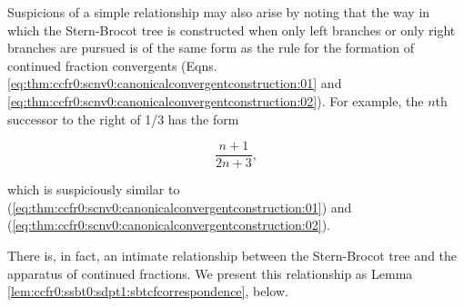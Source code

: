 Suspicions of a simple relationship may also arise by noting that the 
way in which the Stern-Brocot tree is constructed when only left branches
or only right branches are pursued is of the same form as the rule for
the formation of continued fraction convergents (Eqns. 
\ref{eq:thm:ccfr0:scnv0:canonicalconvergentconstruction:01}
and \ref{eq:thm:ccfr0:scnv0:canonicalconvergentconstruction:02}).  For example,
the $n$th successor to the right of 1/3 has the form

\begin{equation}
\label{eq:ccfr0:ssbt0:sdpt1:01}
\frac{n + 1}{2n+3},
\end{equation}

\noindent{}which is suspiciously similar to 
(\ref{eq:thm:ccfr0:scnv0:canonicalconvergentconstruction:01}) and 
(\ref{eq:thm:ccfr0:scnv0:canonicalconvergentconstruction:02}).

There is, in fact, an intimate relationship between the Stern-Brocot
tree and the apparatus of continued fractions.  We present 
this relationship as
Lemma \ref{lem:ccfr0:ssbt0:sdpt1:sbtcfcorrespondence}, 
below.

